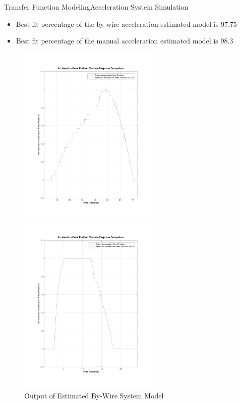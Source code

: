 \documentclass{beamer}
\begin{document}
\begin{frame}{Transfer Function Modeling}{Acceleration System Simulation}
	\begin{block}{}
 \begin{itemize}
	\item Best fit percentage of the by-wire acceleration estimated model is 97.75
	\item Best fit percentage of the manual acceleration estimated model is 98.3
 \end{itemize}
 \begin{figure}
    \centering
    \begin{minipage}{0.45\textwidth}
        \centering
        \includegraphics[width=0.6\textwidth]{figs/img/byWireAccelArxModel} %
        \caption{Output of Estimated By-Wire System Model}
        \label{fig:byWireAccelModel}
    \end{minipage}\hfill
    \begin{minipage}{0.45\textwidth}
        \centering
        \includegraphics[width=0.6\textwidth]{figs/img/manualAccelTransferFunctionModel} %

\end{minipage}
\end{figure}
\end{block}
\end{frame}
\end{document}
